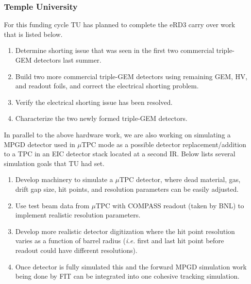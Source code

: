 \subsubsection{Temple University} 
For this funding cycle TU has planned to complete the eRD3 carry over work that is listed below.
\begin{enumerate}
\item Determine shorting issue that was seen in the first two commercial triple-GEM detectors last summer.
\item Build two more commercial triple-GEM detectors using remaining GEM, HV, and readout foils, and correct the electrical shorting problem.
\item Verify the electrical shorting issue has been resolved.
\item Characterize the two newly formed triple-GEM detectors.
\end{enumerate}

In parallel to the above hardware work, we are also working on simulating a MPGD detector used in $\mu$TPC mode as a possible detector replacement/addition to a TPC in an EIC detector stack located at a second IR. Below lists several simulation goals that TU had set.

\begin{enumerate}
\item Develop machinery to simulate a $\mu$TPC detector, where dead material, gas, drift gap size, hit points, and resolution parameters can be easily adjusted.
\item Use test beam data from $\mu$TPC with COMPASS readout (taken by BNL) to implement realistic resolution parameters.
\item Develop more realistic detector digitization where the hit point resolution varies as a function of barrel radius (\emph{i.e.} first and last hit point before readout could have different resolutions).
\item Once detector is fully simulated this and the forward MPGD simulation work being done by FIT can be integrated into one cohesive tracking simulation. 
\end{enumerate}
